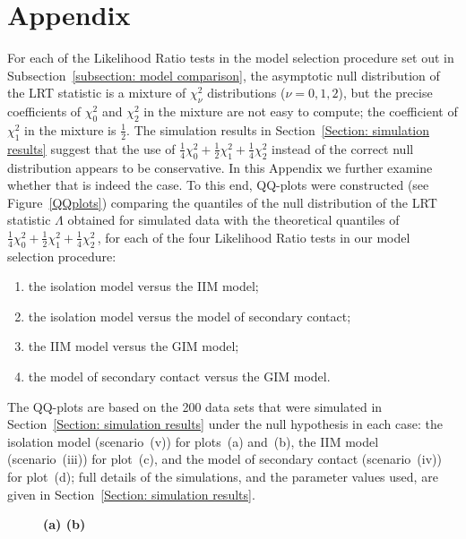 \documentclass[11pt]{article}
\begin{document}
\section*{Appendix}

{\color{red}
For each of the Likelihood Ratio tests in the model selection procedure set out in Subsection~\ref{subsection: model comparison}, the asymptotic null distribution of the LRT statistic is a mixture of $\chi^2_{\nu}$ distributions ($\nu =0,1,2$), but the precise coefficients of $\chi^2_0$ and $\chi^2_2$ in the mixture are not easy to compute; the coefficient of $\chi^2_1$ in the mixture is $\frac{1}{2}$. The simulation results in Section~\ref{Section: simulation results} suggest that the use of $\frac{1}{4} \chi^2_0 +\frac{1}{2} \chi^2_1 +\frac{1}{4} \chi^2_2$ instead of the correct null distribution appears to be conservative. In this Appendix we further examine whether that is indeed the case.
To this end, QQ-plots were constructed (see Figure~\ref{QQplots}) comparing 
the quantiles of the null distribution of the LRT statistic $\Lambda$ obtained for simulated data
with the theoretical quantiles of $\frac{1}{4} \chi^2_0 +\frac{1}{2} \chi^2_1 +\frac{1}{4} \chi^2_2$\,, for each of the four Likelihood Ratio tests in our model selection procedure:
\begin{enumerate}
\item[(a)] the isolation model versus the IIM model; 
\item[(b)] the isolation model versus the model of secondary contact; 
\item[(c)] the IIM model versus the GIM model; 
\item[(d)] the model of secondary contact versus the GIM model. 
\end{enumerate}
The QQ-plots are based on the 200 data sets that were simulated in Section~\ref{Section: simulation results} under the null hypothesis in each case: the isolation model (scenario~(v)) for plots~(a) and~(b), the IIM model (scenario~(iii)) for plot~(c), and the model of secondary contact (scenario~(iv)) for plot~(d);
full details of the simulations, and the parameter values used, are given in Section~\ref{Section: simulation results}.
\begin{figure}[t]
\textbf{\hspace*{-1cm} (a) \hspace*{8cm} (b)}\par\smallskip

\end{figure}}
\end{document}
